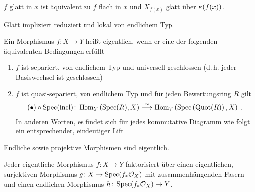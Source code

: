 \documentclass[german]{scrreprt}
\begin{document}
\begin{Definition}[$S$-Modell]
\begin{Definition}
  $f$ glatt in $x$ ist äquivalent zu $f$ flach in $x$ und $X_{f(x)}$
  glatt über $\kappa(f(x))$.
  \cite[siehe][8.5, Proposition 17]{bosch}

  \begin{Bemerkung}
    Glatt impliziert reduziert und lokal von endlichem Typ.
  \end{Bemerkung}
\end{Definition}

\begin{Definition}
  Ein Morphismus $f\colon X\to Y$ heißt eigentlich, wenn er eine der
  folgenden äquivalenten Bedingungen erfüllt
  \begin{enumerate}[label=(\roman*)]
  \item $f$ ist separiert, von endlichem Typ und universell
    geschlossen (d.\,h. jeder Basiswechsel ist geschlossen)
  \item $f$ ist quasi-separiert, von endlichem Typ und für jeden
    Bewertungsring $R$ gilt
    \begin{gather*}
      (\bullet)\circ\operatorname{Spec}(\operatorname{incl})\colon
      \operatorname{Hom}_Y\left(\operatorname{Spec}(R), X\right) \overset{\sim}{\longrightarrow} 
      \operatorname{Hom}_Y\left(\operatorname{Spec}\left(\operatorname{Quot}(R)\right), X\right)\;.
    \end{gather*}
    In anderen Worten, es findet sich für jedes kommutative Diagramm
    wie folgt ein entsprechender, eindeutiger Lift
    \begin{center}
    \end{center}
  \end{enumerate}
  Endliche sowie projektive Morphismen sind eigentlich.
  \cite[siehe][9.5, Remark 5 und Theorem 9]{bosch}

  \begin{Bemerkung}
    Jeder eigentliche Morphismus $f\colon X\to Y$ faktorisiert über
    einen eigentlichen, surjektiven Morphismus $g\colon X\to
    \operatorname{Spec}(f_*\mathcal{O}_X)$ mit zusammenhängenden Fasern und einen endlichen
    Morphismus $h\colon \operatorname{Spec}(f_*\mathcal{O}_X)\to Y$.
    \cite[siehe][9.5, Theorem 12]{bosch}
  \end{Bemerkung}
\end{Definition}


\end{Definition}
\end{document}
